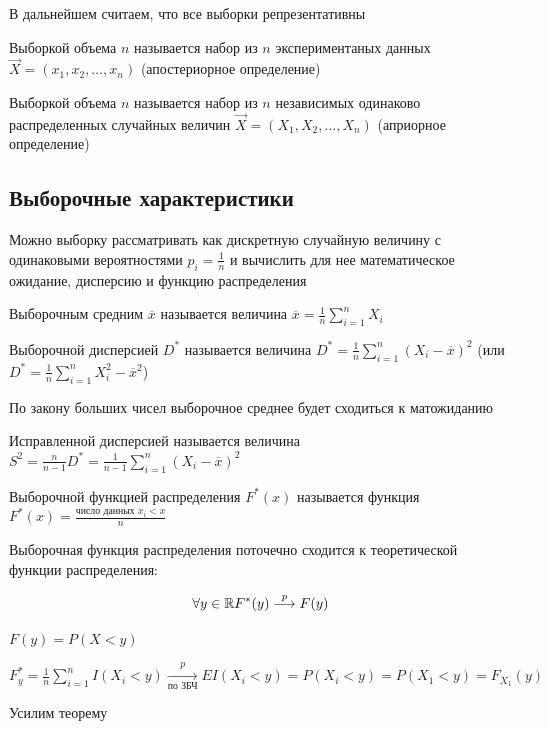 \documentclass[12pt]{article}
\begin{document}
В дальнейшем считаем, что все выборки репрезентативны

 Выборкой объема $n$ называется набор из $n$ экспериментаных данных $\vec{X} = (x_1, x_2, \dots, x_n)$ (апостериорное определение)

 Выборкой объема $n$ называется набор из $n$ независимых одинаково распределенных случайных
величин $\vec{X} = (X_1, X_2, \dots, X_n)$ (априорное определение)

\subsection{Выборочные характеристики}

Можно выборку рассматривать как дискретную случайную величину с одинаковыми вероятностями $p_i = \frac{1}{n}$
и вычислить для нее математическое ожидание, дисперсию и функцию распределения

\Def Выборочным средним $\overline{x}$ называется величина $\overline{x} = \frac{1}{n} \sum_{i = 1}^n X_i$

\Defs Выборочной дисперсией $D^*$ называется величина $D^* = \frac{1}{n} \sum_{i = 1}^n (X_i - \overline{x})^2$ (или $D^* = \frac{1}{n} \sum_{i = 1}^n X_i^2 - \overline{x}^2$)

По закону больших чисел выборочное среднее будет сходиться к матожиданию

\Defs Исправленной дисперсией называется величина $S^2 = \frac{n}{n - 1} D^* = \frac{1}{n - 1}\sum_{i = 1}^n (X_i - \overline{x})^2$

\hypertarget{selective_distribution_function}{}

\Def Выборочной функцией распределения $F^*(x)$ называется функция $F^*(x) = \frac{\text{число данных } x_i < x}{n}$

\begin{MyTheorem}
    \Ths Выборочная функция распределения поточечно сходится к теоретической функции распределения:

    \[\forall y \in \mathbb{R} F^*(y) \overset{p}{\longrightarrow} F(y)\]
\end{MyTheorem}

\begin{MyProof}
    $F(y) = P(X < y)$

    $F^*_y = \frac{1}{n} \sum_{i = 1}^n I(X_i < y) \underset{\text{по ЗБЧ}}{\overset{p}{\longrightarrow}} EI(X_i < y) = P(X_i < y) = 
    P(X_1 < y) = F_{X_1}(y)$
\end{MyProof}

Усилим теорему
\end{document}
